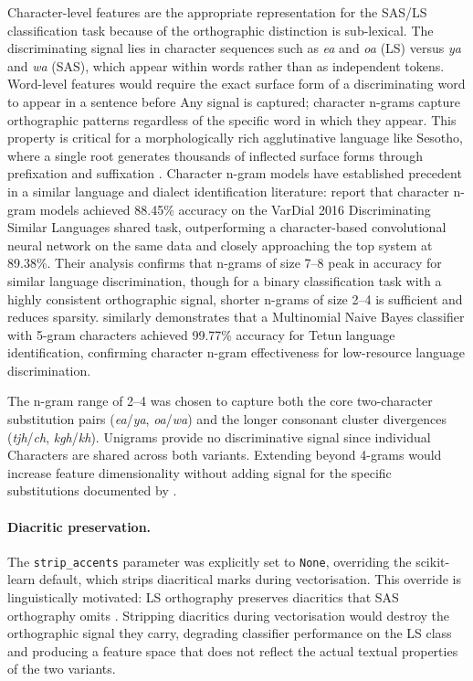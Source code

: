 \documentclass[11pt,a4paper]{article}
\begin{document}
Character-level features are the appropriate representation for
the SAS/LS classification task because of the orthographic distinction
is sub-lexical. The discriminating signal lies in character sequences
such as \textit{ea} and \textit{oa} (LS) versus \textit{ya} and
\textit{wa} (SAS), which appear within words rather than as
independent tokens. Word-level features would require the exact
surface form of a discriminating word to appear in a sentence before
Any signal is captured; character n-grams capture orthographic
patterns regardless of the specific word in which they appear.
This property is critical for a morphologically rich agglutinative
language like Sesotho, where a single root generates thousands of
inflected surface forms through prefixation and suffixation
\citep{kambarami2021computational}. Character n-gram models have
established precedent in a similar language and dialect
identification literature: \citet{cianflone2016n} report that
character n-gram models achieved 88.45\% accuracy on the VarDial
2016 Discriminating Similar Languages shared task, outperforming a
character-based convolutional neural network on the same data and
closely approaching the top system at 89.38\%. Their analysis
confirms that n-grams of size 7--8 peak in accuracy for similar
language discrimination, though for a binary classification task
with a highly consistent orthographic signal, shorter n-grams of
size 2--4 is sufficient and reduces sparsity.
\citet{de2024data} similarly demonstrates that a Multinomial
Naive Bayes classifier with 5-gram characters achieved 99.77\%
accuracy for Tetun language identification, confirming character
n-gram effectiveness for low-resource language discrimination.

The n-gram range of 2--4 was chosen to capture both the core
two-character substitution pairs (\textit{ea}/\textit{ya},
\textit{oa}/\textit{wa}) and the longer consonant cluster
divergences (\textit{tjh}/\textit{ch}, \textit{kgh}/\textit{kh}).
Unigrams provide no discriminative signal since individual
Characters are shared across both variants. Extending beyond
4-grams would increase feature dimensionality without adding
signal for the specific substitutions documented by
\citet{makutoane2022people}.

\paragraph{Diacritic preservation.}
The \texttt{strip\_accents} parameter was explicitly set to
\texttt{None}, overriding the scikit-learn default, which strips
diacritical marks during vectorisation. This override is
linguistically motivated: LS orthography preserves diacritics
that SAS orthography omits \citep{matlosa2017sesotho}. Stripping
diacritics during vectorisation would destroy the orthographic
signal they carry, degrading classifier performance on the LS
class and producing a feature space that does not reflect the
actual textual properties of the two variants.
\end{document}
